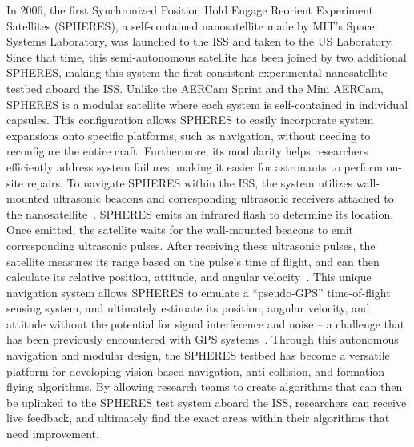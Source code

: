 \documentclass[journal, 10pt]{IEEEtran}
\begin{document}
In 2006, the first Synchronized Position Hold Engage Reorient Experiment Satellites (SPHERES), a self-contained nanosatellite made by MIT's Space Systems Laboratory, was launched to the ISS and taken to the US Laboratory. Since that time, this semi-autonomous satellite has been joined by two additional SPHERES, making this system the first consistent experimental nanosatellite testbed aboard the ISS. Unlike the AERCam Sprint and the Mini AERCam, SPHERES is a modular satellite where each system is self-contained in individual capsules. This configuration allows SPHERES to easily incorporate system expansions onto specific platforms, such as navigation, without needing to reconfigure the entire craft. Furthermore, its modularity helps researchers efficiently address system failures, making it easier for astronauts to perform on-site repairs. To navigate SPHERES within the ISS, the system utilizes wall-mounted ultrasonic beacons and corresponding ultrasonic receivers attached to the nanosatellite~\cite{SPHERES}. SPHERES emits an infrared flash to determine its location. Once emitted, the satellite waits for the wall-mounted beacons to emit corresponding ultrasonic pulses. After receiving these ultrasonic pulses, the satellite measures its range based on the pulse's time of flight, and can then calculate its relative position, attitude, and angular velocity~\cite{SPHERES, Vertigo1}. This unique navigation system allows SPHERES to emulate a ``pseudo-GPS'' time-of-flight sensing system, and ultimately estimate its position, angular velocity, and attitude without the potential for signal interference and noise -- a challenge that has been previously encountered with GPS systems~\cite{Vertigo1}. Through this autonomous navigation and modular design, the SPHERES testbed has become a versatile platform for developing vision-based navigation, anti-collision, and formation flying algorithms. By allowing research teams to create algorithms that can then be uplinked to the SPHERES test system aboard the ISS, researchers can receive live feedback, and ultimately find the exact areas within their algorithms that need improvement.

\end{document}
